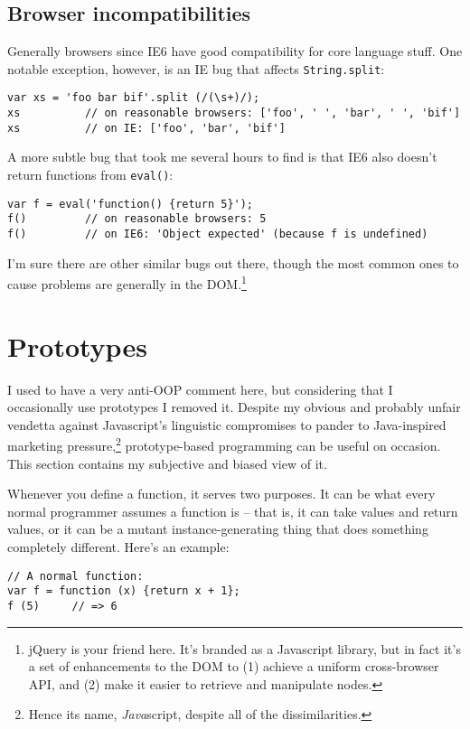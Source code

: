 \documentclass{article}
\begin{document}
\subsection {Browser incompatibilities}
    Generally browsers since IE6 have good compatibility for core language stuff. One notable exception, however, is an IE bug that affects \verb|String.split|:

\begin{verbatim}
var xs = 'foo bar bif'.split (/(\s+)/);
xs          // on reasonable browsers: ['foo', ' ', 'bar', ' ', 'bif']
xs          // on IE: ['foo', 'bar', 'bif']
\end{verbatim}

    A more subtle bug that took me several hours to find is that IE6 also doesn't return functions from \verb|eval()|:

\begin{verbatim}
var f = eval('function() {return 5}');
f()         // on reasonable browsers: 5
f()         // on IE6: 'Object expected' (because f is undefined)
\end{verbatim}

    I'm sure there are other similar bugs out there, though the most common ones to cause problems are generally in the DOM.\footnote{jQuery is your friend here. It's branded as a Javascript
    library, but in fact it's a set of enhancements to the DOM to (1) achieve a uniform cross-browser API, and (2) make it easier to retrieve and manipulate nodes.}

\section {Prototypes}
  \label{sec:prototypes}
  I used to have a very anti-OOP comment here, but considering that I occasionally use prototypes I removed it. Despite my obvious and probably unfair vendetta against Javascript's linguistic
  compromises to pander to Java-inspired marketing pressure,\footnote{Hence its name, {\it Java}script, despite all of the dissimilarities.} prototype-based programming can be useful on
  occasion. This section contains my subjective and biased view of it.

  Whenever you define a function, it serves two purposes. It can be what every normal programmer assumes a function is -- that is, it can take values and return values, or it can be a
  mutant instance-generating thing that does something completely different. Here's an example:

\begin{verbatim}
// A normal function:
var f = function (x) {return x + 1};
f (5)     // => 6
\end{verbatim}
\end{document}
